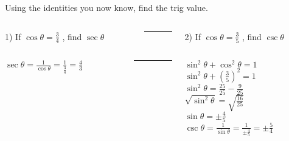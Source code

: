 \begin{frame}{Using the identities you now know, find the trig value.}
\begin{columns}
\begin{column}{0.5\textwidth}
   1) If $\cos\theta = \frac{3}{4}$ , find $\sec\theta$
   \\
   
\end{column}
\begin{column}{.02\textwidth}
        \rule{.1mm}{0.1\textheight}
    \end{column}
\begin{column}{0.5\textwidth}
   2) If $\cos\theta = \frac{3}{5}$ , find $\csc\theta$
   \\
   \pause
\end{column}
\end{columns}

\begin{columns}
\begin{column}{0.5\textwidth}
   $\sec\theta = \frac{1}{\cos\theta} = \frac{1}{\frac{3}{4}} = \frac{4}{3}$
   
\end{column}
\begin{column}{.02\textwidth}
        \rule{.1mm}{0.7\textheight}
        \pause
    \end{column}
\begin{column}{0.5\textwidth}
   $\sin^2\theta + \cos^2\theta = 1$
   \\
   $\sin^2\theta + (\frac{3}{5})^2 = 1$
   \\
   $\sin^2\theta = \frac{25}{25} - \frac{9}{25}$
   \\
   $\sqrt{\sin^2\theta} = \sqrt{\frac{16}{25}}$
   \\
   $\sin\theta  = \pm \frac{4}{5}$
   \\
   $\csc\theta = \frac{1}{\sin\theta} = \frac{1}{\pm \frac{4}{5}} = \pm \frac{5}{4}$
   \\
\end{column}
\end{columns}
    
\end{frame}